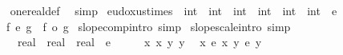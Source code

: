 \begin{isabellebody}
\isadelimproof
\ %
\endisadelimproof
%
\isatagproof
{}\isamarkupfalse%
\ one{\isacharunderscore}{\kern0pt}real{\isacharunderscore}{\kern0pt}def\ \isamarkupfalse%
\ simp%
\endisatagproof
{\isafoldproof}%
%
\isadelimproof
%
\endisadelimproof
\isanewline
\isanewline
{}\isamarkupfalse%
\ eudoxus{\isacharunderscore}{\kern0pt}times\ {\isacharcolon}{\kern0pt}{\isacharcolon}{\kern0pt}\ {\isachardoublequoteopen}{\isacharparenleft}{\kern0pt}int\ {\isasymRightarrow}\ int{\isacharparenright}{\kern0pt}\ {\isasymRightarrow}\ {\isacharparenleft}{\kern0pt}int\ {\isasymRightarrow}\ int{\isacharparenright}{\kern0pt}\ {\isasymRightarrow}\ int\ {\isasymRightarrow}\ int{\isachardoublequoteclose}\ {\isacharparenleft}{\kern0pt}\ {\isachardoublequoteopen}{\isacharasterisk}{\kern0pt}\isactrlsub e{\isachardoublequoteclose}\ {}{}{\isacharparenright}{\kern0pt}\ \isanewline
\ \ {\isachardoublequoteopen}f\ {\isacharasterisk}{\kern0pt}\isactrlsub e\ g\ {\isacharequal}{\kern0pt}\ f\ o\ g{\isachardoublequoteclose}\isanewline
\isanewline
{}\isamarkupfalse%
\ slope{\isacharunderscore}{\kern0pt}comp{\isacharbrackleft}{\kern0pt}intro{\isacharcomma}{\kern0pt}\ simp{\isacharbrackright}{\kern0pt}\isanewline
{}\isamarkupfalse%
\ slope{\isacharunderscore}{\kern0pt}scale{\isacharbrackleft}{\kern0pt}intro{\isacharcomma}{\kern0pt}\ simp{\isacharbrackright}{\kern0pt}\isanewline
\isanewline
{}\isamarkupfalse%
\isanewline
\ \ {\isachardoublequoteopen}{\isacharparenleft}{\kern0pt}{\isacharasterisk}{\kern0pt}{\isacharparenright}{\kern0pt}\ {\isacharcolon}{\kern0pt}{\isacharcolon}{\kern0pt}\ real\ {\isasymRightarrow}\ real\ {\isasymRightarrow}\ real{\isachardoublequoteclose}\ \ {\isachardoublequoteopen}{\isacharparenleft}{\kern0pt}{\isacharasterisk}{\kern0pt}\isactrlsub e{\isacharparenright}{\kern0pt}{\isachardoublequoteclose}\isanewline
%
\isadelimproof
%
\endisadelimproof
%
\isatagproof
{}\isamarkupfalse%
\ {\isacharminus}{\kern0pt}\isanewline
\ \ \isamarkupfalse%
\ x\ x{\isacharprime}{\kern0pt}\ y\ y{\isacharprime}{\kern0pt}\ \isamarkupfalse%
\ {\isachardoublequoteopen}x\ {\isasymsim}\isactrlsub e\ x{\isacharprime}{\kern0pt}{\isachardoublequoteclose}\ {\isachardoublequoteopen}y\ {\isasymsim}\isactrlsub e\ y{\isacharprime}{\kern0pt}{\isachardoublequoteclose}\isanewline
\ \ \isamarkupfalse%

\end{isabellebody}
